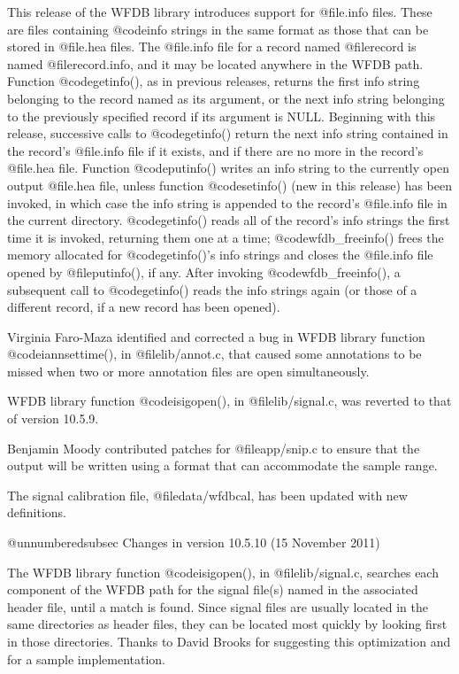 {{{{{{{{This release of the WFDB library introduces support for @file{.info} files.
These are files containing @code{info} strings in the same format as those that
can be stored in @file{.hea} files.  The @file{.info} file for a record named
@file{record} is named @file{record.info}, and it may be located anywhere in
the WFDB path.  Function @code{getinfo()}, as in previous releases, returns the
first info string belonging to the record named as its argument, or the next
info string belonging to the previously specified record if its argument is
NULL.  Beginning with this release, successive calls to @code{getinfo()} return
the next info string contained in the record's @file{.info} file if it exists,
and if there are no more in the record's @file{.hea} file.  Function
@code{putinfo()} writes an info string to the currently open output @file{.hea}
file, unless function @code{setinfo()} (new in this release) has been invoked,
in which case the info string is appended to the record's @file{.info} file in
the current directory.  @code{getinfo()} reads all of the record's info strings
the first time it is invoked, returning them one at a time;
@code{wfdb_freeinfo()} frees the memory allocated for @code{getinfo()}'s info
strings and closes the @file{.info} file opened by @file{putinfo()}, if any.
After invoking @code{wfdb_freeinfo()}, a subsequent call to @code{getinfo()}
reads the info strings again (or those of a different record, if a new record
has been opened).

Virginia Faro-Maza identified and corrected a bug in WFDB library function
@code{iannsettime()}, in @file{lib/annot.c}, that caused some annotations to be
missed when two or more annotation files are open simultaneously.

WFDB library function @code{isigopen()}, in @file{lib/signal.c}, was reverted
to that of version 10.5.9.

Benjamin Moody contributed patches for @file{app/snip.c} to ensure that the
output will be written using a format that can accommodate the sample
range.

The signal calibration file, @file{data/wfdbcal}, has been updated with
new definitions.

@unnumberedsubsec Changes in version 10.5.10 (15 November 2011)

The WFDB library function @code{isigopen()}, in @file{lib/signal.c}, searches
each component of the WFDB path for the signal file(s) named in the associated
header file, until a match is found.  Since signal files are usually located in
the same directories as header files, they can be located most quickly by
looking first in those directories.  Thanks to David Brooks for suggesting this
optimization and for a sample implementation.

}}}}}}}}
